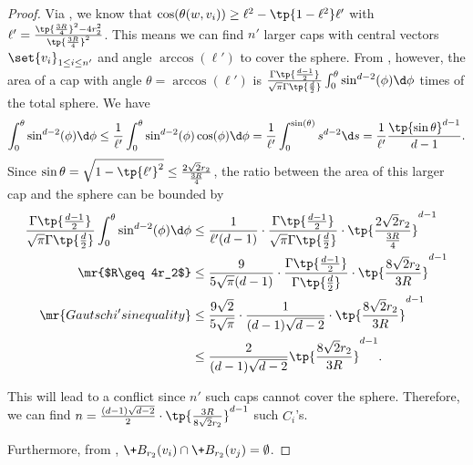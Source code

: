 \begin{proof}
    Via , we know that $\cos(\theta(w,v_i))\geq \ell^2 - \tp{1-\ell^2}  \ell'$ with $\ell'=\frac{\tp{\frac{3R}{4}}^2-4r_2^2}{\tp{\frac{3R}{4}}^2}$. 
    This means we can find $n'$ larger caps with central vectors $\set{v_i}_{1\leq i\leq n'}$ and angle $\arccos(\ell')$ to cover the sphere.
    From \cite{L11}, however, the area of a cap with angle $\theta = \arccos(\ell')$ is $\frac{\Gamma\tp{\frac{d-1}{2}}}{\sqrt{\pi}\Gamma\tp{\frac{d}{2}}} \int_{0}^{\theta} \sin^{d-2}(\phi)\d \phi$ times of the total sphere. We have
    \[
         \int_{0}^{\theta} \sin^{d-2}(\phi)\d \phi \leq \frac{1}{\ell'} \int_{0}^{\theta} \sin^{d-2}(\phi)\cos (\phi)\d \phi = \frac{1}{\ell'} \int_0^{\sin(\theta)} s^{d-2} \d s = \frac{1}{\ell'} \frac{\tp{\sin \theta}^{d-1}}{d-1}.
    \]
    Since $\sin \theta = \sqrt{1-\tp{\ell'}^2}\leq \frac{2\sqrt{2}r_2}{\frac{3R}{4}}$, the ratio between the area of this larger cap and the sphere can be bounded by
    \begin{align*}
        \frac{\Gamma\tp{\frac{d-1}{2}}}{\sqrt{\pi}\Gamma\tp{\frac{d}{2}}} \int_{0}^{\theta} \sin^{d-2}(\phi)\d \phi & \leq \frac{1}{\ell' (d-1)}\cdot \frac{\Gamma\tp{\frac{d-1}{2}}}{\sqrt{\pi}\Gamma\tp{\frac{d}{2}}}\cdot \tp{\frac{2\sqrt{2}r_2}{\frac{3R}{4}}}^{d-1} \\
        \mr{$R\geq 4r_2$}
        &\leq \frac{9}{5\sqrt{\pi}(d-1)} \cdot \frac{\Gamma\tp{\frac{d-1}{2}}}{\Gamma\tp{\frac{d}{2}}} \cdot \tp{\frac{8\sqrt{2}r_2}{3R}}^{d-1} \\
        \mr{Gautschi's inequality}
        &\leq \frac{9\sqrt{2}}{5\sqrt{\pi}}\cdot \frac{1}{(d-1)\sqrt{d-2}}\cdot \tp{\frac{8\sqrt{2}r_2}{3R}}^{d-1}\\
        &\leq \frac{2}{(d-1)\sqrt{d-2}} \tp{\frac{8\sqrt{2}r_2}{3R}}^{d-1}.
    \end{align*}
    
    This will lead to a conflict since $n'$ such caps cannot cover the sphere. Therefore, we can find $n= \frac{(d-1)\sqrt{d-2}}{2}\cdot \tp{\frac{3R}{8\sqrt{2}r_2}}^{d-1}$ such $C_i$'s.
    
    Furthermore, from , $\+B_{r_2}(v_i)\cap \+B_{r_2}(v_j)=\emptyset$.
\end{proof}

